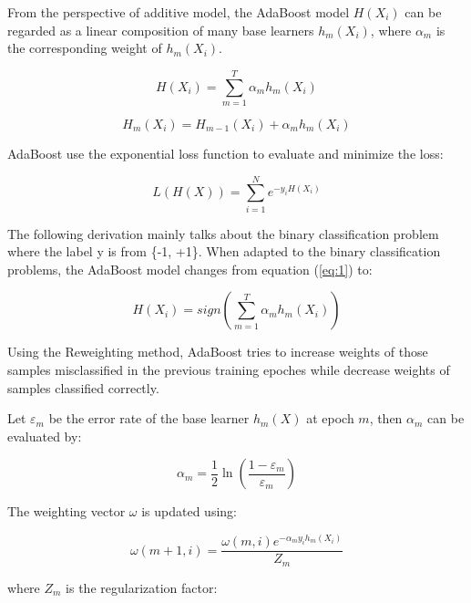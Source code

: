 \documentclass[journal, a4paper, onecolumn]{IEEEtran}
\begin{document}
\begin{multicols}{2}
From the perspective of additive model, the AdaBoost model $H\left(X_i\right)$ can be regarded as a linear composition of many base learners $h_m\left(X_i\right)$, where $\alpha_m$ is the corresponding weight of $h_m\left(X_i\right)$.

\begin{equation}
H\left(X_i\right)=\sum_{m=1}^{T}{\alpha_mh_m\left(X_i\right)}\label{eq:1}
\end{equation}


\begin{equation}
H_m\left(X_i\right)=H_{m-1}\left(X_i\right)+\alpha_mh_m\left(X_i\right)
\end{equation}

AdaBoost use the exponential loss function to evaluate and minimize the loss:

\begin{equation}
L\left(H\left(X\right)\right)=\sum_{i=1}^{N}{e^{-y_iH\left(X_i\right)}}
\end{equation}

The following derivation mainly talks about the binary classification problem where the label y is from \{-1, +1\}.
When adapted to the binary classification problems, the AdaBoost model changes from equation (\ref{eq:1}) to:

\begin{equation}
H\left(X_i\right)=sign\left(\sum_{m=1}^{T}{\alpha_mh_m\left(X_i\right)}\right)
\end{equation}

Using the Reweighting method, AdaBoost tries to increase weights of those samples misclassified in the previous training epoches while decrease weights of samples classified correctly.

Let $\varepsilon_m$ be the error rate of the base learner $h_m\left(X\right)$ at epoch $m$, then $\alpha_m$ can be evaluated by:

\begin{equation}
\alpha_m=\frac{1}{2}\ln\left(\frac{1-\varepsilon_m}{\varepsilon_m}\right)
\end{equation}

The weighting vector $\omega$ is updated using:

\begin{equation}
\omega\left(m+1,i\right)=\frac{\omega\left(m,i\right)e^{-\alpha_my_ih_m\left(X_i\right)}}{Z_{m}}
\end{equation}

where $Z_{m}$ is the regularization factor:


\end{multicols}
\end{document}

